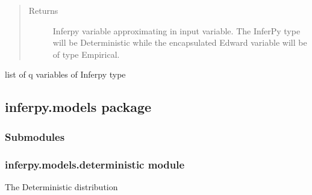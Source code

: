 \documentclass[letterpaper,10pt,english]{sphinxmanual}
\begin{document}
\begin{fulllineitems}
\begin{fulllineitems}
\begin{quote}
\begin{description}
\begin{itemize}
\end{itemize}

\item[{Returns}] \leavevmode
Inferpy variable approximating in input variable. The InferPy type will be Deterministic while
the encapsulated Edward variable will be of type Empirical.

\end{description}\end{quote}

\end{fulllineitems}


\begin{fulllineitems}
\label{\detokenize{modules/inferpy.inferences:inferpy.inferences.qmodel.Qmodel.varlist}}
list of q variables of Inferpy type

\end{fulllineitems}


\end{fulllineitems}



\subsection{inferpy.models package}
\label{\detokenize{modules/inferpy.models::doc}}\label{\detokenize{modules/inferpy.models:inferpy-models-package}}

\subsubsection{Submodules}
\label{\detokenize{modules/inferpy.models:submodules}}

\subsubsection{inferpy.models.deterministic module}
\label{\detokenize{modules/inferpy.models:module-inferpy.models.deterministic}}\label{\detokenize{modules/inferpy.models:inferpy-models-deterministic-module}}
The Deterministic distribution
\end{document}
